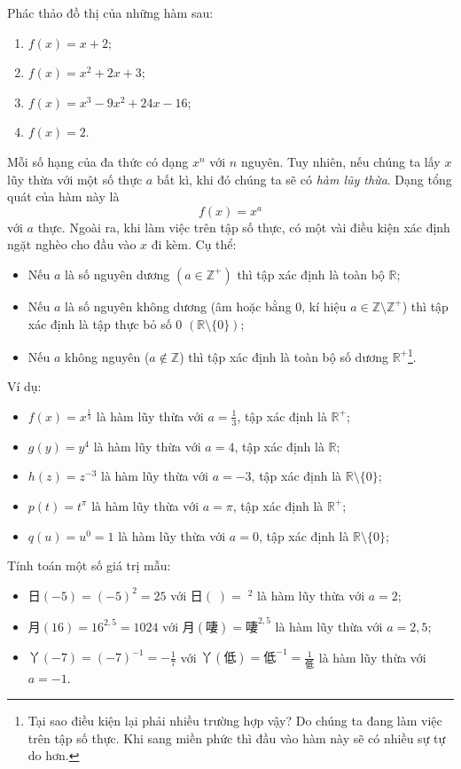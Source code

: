 \exercise Phác thảo đồ thị của những hàm sau:
\begin{multicols}{2}
\begin{enumerate}
   \item $f(x) = x + 2$; 
   \item $f(x) = x^2 + 2x + 3$;
   \item $f(x) = x^3 - 9x^2 + 24x - 16$;
   \item $f(x) = 2$.
\end{enumerate}
\end{multicols}

\solution

Mỗi số hạng của đa thức có dạng $x^n$ với $n$ nguyên. Tuy nhiên, nếu chúng ta lấy $x$ lũy thừa với một số thực $a$ bất kì, khi đó chúng ta sẽ có \emph{hàm lũy thừa}. Dạng tổng quát của hàm này là $$f(x) = x^a$$ với $a$ thực. Ngoài ra, khi làm việc trên tập số thực, có một vài điều kiện xác định ngặt nghèo cho đầu vào $x$ đi kèm. Cụ thể:
\begin{itemize}
   \item Nếu $a$ là số nguyên dương $\left(a \in \mathbb{Z}^+\right)$ thì tập xác định là toàn bộ $\mathbb{R}$;
   \item Nếu $a$ là số nguyên không dương (âm hoặc bằng $0$, kí hiệu $a \in \mathbb{Z} \setminus\mathbb{Z}^+$) thì tập xác định là tập thực bỏ số $0$ $\left(\mathbb{R} \setminus \{0\}\right)$;
   \item Nếu $a$ không nguyên ($a \notin \mathbb{Z}$) thì tập xác định là toàn bộ số dương $\mathbb{R}^+$\footnote{Tại sao điều kiện lại phải nhiều trường hợp vậy? Do chúng ta đang làm việc trên tập số thực. Khi sang miền phức thì đầu vào hàm này sẽ có nhiều sự tự do hơn.}.
\end{itemize}
Ví dụ:
\begin{itemize}
   \item $f(x) = x^{\frac{1}{3}}$ là hàm lũy thừa với $a = \frac{1}{3}$, tập xác định là $\mathbb{R}^+$;
   \item $g(y) = y^{4}$ là hàm lũy thừa với $a = 4$, tập xác định là $\mathbb{R}$;
   \item $h(z) = z^{-3}$ là hàm lũy thừa với $a = -3$, tập xác định là $\mathbb{R} \setminus \{0\}$;
   \item $p(t) = t^{\pi}$ là hàm lũy thừa với $a = \pi$, tập xác định là $\mathbb{R}^+$;
   \item $q(u) = u^0 = 1$ là hàm lũy thừa với $a = 0$, tập xác định là $\mathbb{R} \setminus \{0\}$;
\end{itemize}
Tính toán một số giá trị mẫu:
\begin{itemize}
   \item $\textit{日}(-5) = (-5)^2 = 25$ với $\textit{日}\left(\textit{𠶎}\right) = \textit{𠶎}^2$ là hàm lũy thừa với $a = 2$;
   \item $\textit{月}(16) = 16^{2,5} = 1024$ với $\textit{月}\left(\textit{啛}\right) = \textit{啛}^{2,5}$ là hàm lũy thừa với $a = 2,5$;
   \item $\textit{丫}(-7) = (-7)^{-1} = -\frac{1}{7}$ với $\textit{丫}\left(\textit{低}\right) = \textit{低}^{-1} = \frac{1}{\textit{低}}$ là hàm lũy thừa với $a = -1$.
\end{itemize}

